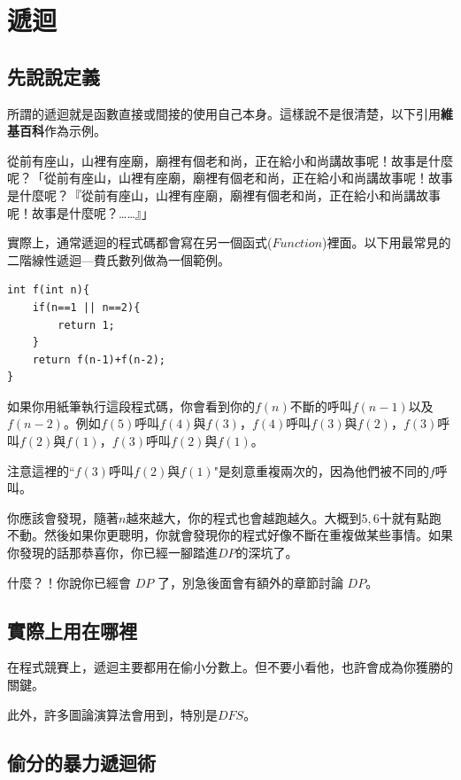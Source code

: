 \section{遞迴}
    \subsection{先說說定義}
    所謂的遞迴就是函數直接或間接的使用自己本身。這樣說不是很清楚，以下引用\textbf{維基百科}作為示例。

    \begin{quoting}
        從前有座山，山裡有座廟，廟裡有個老和尚，正在給小和尚講故事呢！故事是什麼呢？「從前有座山，山裡有座廟，廟裡有個老和尚，正在給小和尚講故事呢！故事是什麼呢？『從前有座山，山裡有座廟，廟裡有個老和尚，正在給小和尚講故事呢！故事是什麼呢？……』」
    \end{quoting}

    實際上，通常遞迴的程式碼都會寫在另一個函式($Function$)裡面。以下用最常見的二階線性遞迴—費氏數列做為一個範例。

    \begin{lstlisting}[caption=費氏數列的範例]
int f(int n){
    if(n==1 || n==2){
        return 1;
    }
    return f(n-1)+f(n-2);
}\end{lstlisting}

    如果你用紙筆執行這段程式碼，你會看到你的$f(n)$不斷的呼叫$f(n-1)$以及$f(n-2)$。例如$f(5)$呼叫$f(4)$與$f(3)$，$f(4)$呼叫$f(3)$與$f(2)$，$f(3)$呼叫$f(2)$與$f(1)$，$f(3)$呼叫$f(2)$與$f(1)$。

    注意這裡的``$f(3)$呼叫$f(2)$與$f(1)$"是刻意重複兩次的，因為他們被不同的$f$呼叫。

    你應該會發現，隨著$n$越來越大，你的程式也會越跑越久。大概到$5,6$十就有點跑不動。然後如果你更聰明，你就會發現你的程式好像不斷在重複做某些事情。如果你發現的話那恭喜你，你已經一腳踏進$DP$的深坑了。

    什麼？！你說你已經會 $DP$ 了，別急後面會有額外的章節討論 $DP$。

    \subsection{實際上用在哪裡}
    在程式競賽上，遞迴主要都用在偷小分數上。但不要小看他，也許會成為你獲勝的關鍵。

    此外，許多圖論演算法會用到，特別是$DFS$。

    \subsection{偷分的暴力遞迴術}

